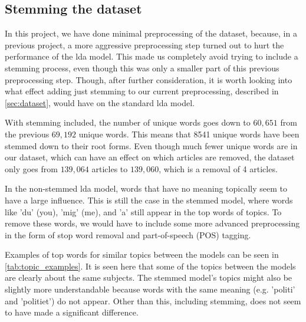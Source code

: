 \subsection{Stemming the dataset}\label{sec:stemming}
In this project, we have done minimal preprocessing of the dataset, because, in a previous project, a more aggressive preprocessing step turned out to hurt the performance of the \gls{lda} model.
This made us completely avoid trying to include a stemming process, even though this was only a smaller part of this previous preprocessing step.
Though, after further consideration, it is worth looking into what effect adding just stemming to our current preprocessing, described in \autoref{sec:dataset}, would have on the standard \gls{lda} model.

With stemming included, the number of unique words goes down to $60,651$ from the previous $69,192$ unique words.
This means that 8541 unique words have been stemmed down to their root forms.
Even though much fewer unique words are in our dataset, which can have an effect on which articles are removed, the dataset only goes from $139,064$ articles to $139,060$, which is a removal of 4 articles.

In the non-stemmed \gls{lda} model, words that have no meaning topically seem to have a large influence.
This is still the case in the stemmed model, where words like 'du' (you), 'mig' (me), and 'a' still appear in the top words of topics.
To remove these words, we would have to include some more advanced preprocessing in the form of stop word removal and part-of-speech (POS) tagging.

Examples of top words for similar topics between the models can be seen in \autoref{tab:topic_examples}.
It is seen here that some of the topics between the models are clearly about the same subjects.
The stemmed model's topics might also be slightly more understandable because words with the same meaning (e.g. 'politi' and 'politiet') do not appear.
Other than this, including stemming, does not seem to have made a significant difference.

